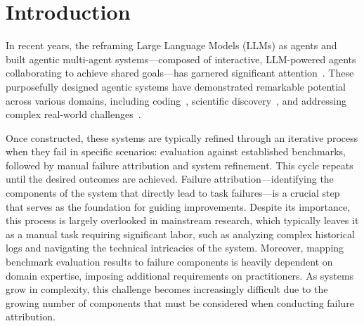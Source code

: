 
\begin{abstract}
Failure attribution in LLM multi-agent systems—identifying the agent and step responsible for task failures—provides crucial clues for systems debugging but remains underexplored and labor-intensive. 
In this paper, we propose and formulate a new research area: \textbf{automated failure attribution} for LLM multi-agent systems.
To support this initiative, we introduce the \textbf{Who\&When} dataset, comprising extensive failure logs from 127 LLM multi-agent systems with fine-grained annotations linking failures to specific agents and decisive error steps.
Using the Who\&When, we develop and evaluate three automated failure attribution methods, summarizing their corresponding pros and cons. 
The best method achieves 53.5\% accuracy in identifying failure-responsible agents but only 14.2\% in pinpointing failure steps, with some methods performing below random. 
Even SOTA reasoning models, such as OpenAI o1 and DeepSeek R1, fail to achieve practical usability.
These results highlight the task's complexity and the need for further research in this area. Code and dataset are available in \href{https://github.com/mingyin1/Agents_Failure_Attribution}{the public repository}.
\end{abstract}


\section{Introduction}
\label{sec:intro} 
In recent years, the reframing Large Language Models (LLMs) as agents and built agentic multi-agent systems—composed of interactive, LLM-powered agents collaborating to achieve shared goals—has garnered significant attention~\citep{wu2023autogen, li2023camel, hong2023metagpt}. 
These purposefully designed agentic systems have demonstrated remarkable potential across various domains, including coding~\citep{hong2023metagpt}, scientific discovery~\citep{ghafarollahi2024sciagents}, and addressing complex real-world challenges~\citep{fourney2024magentic}.

Once constructed, these systems are typically refined through an iterative process when they fail in specific scenarios: evaluation against established benchmarks, followed by manual failure attribution and system refinement. 
This cycle repeats until the desired outcomes are achieved. 
Failure attribution—identifying the components of the system that directly lead to task failures—is a crucial step that serves as the foundation for guiding improvements. 
Despite its importance, this process is largely overlooked in mainstream research, which typically leaves it as a manual task requiring significant labor, such as analyzing complex historical logs and navigating the technical intricacies of the system. 
Moreover, mapping benchmark evaluation results to failure components is heavily dependent on domain expertise, imposing additional requirements on practitioners.
As systems grow in complexity, this challenge becomes increasingly difficult due to the growing number of components that must be considered when conducting failure attribution. 

